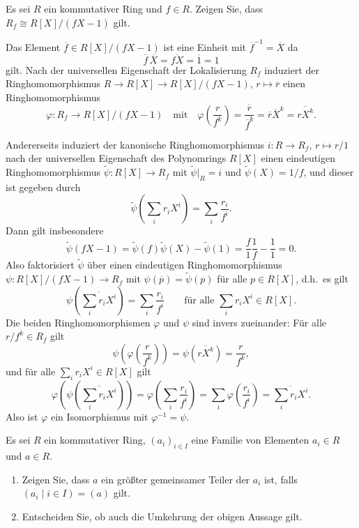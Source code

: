 \begin{question}[subtitle = Lokalisierung durch Quotienten]
  Es sei $R$ ein kommutativer Ring und $f \in R$.
  Zeigen Sie, dass $R_f \cong R[X]/(fX-1)$ gilt.
\end{question}


\begin{solution}
  Das Element $\overline{f} \in R[X]/(fX-1)$ ist eine Einheit mit $\overline{f}^{-1} = \overline{X}$ da
  \[
      \overline{f} \, \overline{X}
    = \overline{fX}
    = \overline{1}
    = 1
  \]
  gilt.
  Nach der universellen Eigenschaft der Lokalisierung $R_f$ induziert der Ringhomomorphismus $R \to R[X] \to R[X]/(fX-1)$, $r \mapsto \overline{r}$ einen Ringhomomorphismus 
  \[
      \varphi \colon R_f \to R[X]/(fX-1)
    \quad\text{mit}\quad
      \varphi\left( \frac{r}{f^k} \right)
    = \frac{\overline{r}}{\overline{f}^k}
    = \overline{r} \overline{X}^k
    = \overline{r X^k}.
  \]
  
  Andererseits induziert der kanonische Ringhomomorphismus $i \colon R \to R_f$, $r \mapsto r/1$ nach der universellen Eigenschaft des Polynomrings $R[X]$ einen eindeutigen Ringhomomorphismus $\tilde{\psi} \colon R[X] \to R_f$ mit $\tilde{\psi}|_R = i$ und $\tilde{\psi}(X) = 1/f$, und dieser ist gegeben durch
  \[
      \tilde{\psi}\left( \sum_i r_i X^i \right)
    = \sum_i \frac{r_i}{f^i}.
  \]
  Dann gilt insbesondere
  \[
      \tilde{\psi}(fX-1)
    = \tilde{\psi}(f) \tilde{\psi}(X) - \tilde{\psi}(1)
    = \frac{f}{1} \frac{1}{f} - \frac{1}{1}
    = 0.
  \]
  Also faktorisiert $\tilde{\psi}$ über einen eindeutigen Ringhomomorphismus $\psi \colon R[X]/(fX-1) \to R_f$ mit $\psi(\overline{p}) = \tilde{\psi}(p)$ für alle $p \in R[X]$, d.h.\ es gilt
  \[
      \psi\left( \overline{ \sum_i r_i X^i } \right)
    = \sum_i \frac{r_i}{f^i}
    \qquad
    \text{für alle $\sum_i r_i X^i \in R[X]$}.
  \]
  Die beiden Ringhomomorphismen $\varphi$ und $\psi$ sind invers zueinander:
  Für alle $r/f^k \in R_f$ gilt
  \[
      \psi\left( \varphi\left( \frac{r}{f^k} \right) \right)
    = \psi\left( \overline{r X^k} \right)
    = \frac{r}{f^k},
  \]
  und für alle $\sum_i r_i X^i \in R[X]$ gilt
  \[
      \varphi\left( \psi\left( \overline{\sum_i r_i X^i} \right) \right)
    = \varphi\left( \sum_i \frac{r_i}{f^i} \right)
    = \sum_i \varphi\left( \frac{r_i}{f^i} \right)
    = \overline{\sum_i r_i X^i}.
  \]
  Also ist $\varphi$ ein Isomorphismus mit $\varphi^{-1} = \psi$.
\end{solution}


\begin{question}[subtitle = Idealtheoretische Beschreibung größter gemeinsamer Teiler]
  \label{question: greatest common divisor via generated ideal}
  Es sei $R$ ein kommutativer Ring, $(a_i)_{i \in I}$ eine Familie von Elementen $a_i \in R$ und $a \in R$.
  \begin{enumerate}
    \item
      Zeigen Sie, dass $a$ ein größter gemeinsamer Teiler der $a_i$ ist, falls $(a_i \mid i \in I) = (a)$ gilt.
    \item
      Entscheiden Sie, ob auch die Umkehrung der obigen Aussage gilt.
  \end{enumerate}
\end{question}


